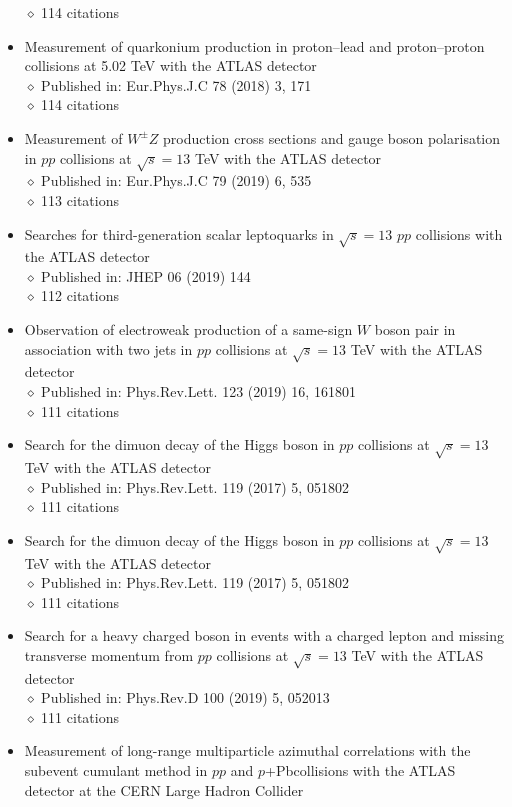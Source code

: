 \documentclass[margin, 10pt]{res} %
\begin{document}
\begin{resume}
\begin{itemize}
$\diamond$ 114 citations
\item Measurement of quarkonium production in proton–lead and proton–proton collisions at 5.02 TeV with the ATLAS detector\\
$\diamond$ Published in: Eur.Phys.J.C 78 (2018) 3, 171\\
$\diamond$ 114 citations
\item Measurement of $W^{\pm}Z$ production cross sections and gauge boson polarisation in $pp$ collisions at $\sqrt{s} = 13$ TeV with the ATLAS detector\\
$\diamond$ Published in: Eur.Phys.J.C 79 (2019) 6, 535\\
$\diamond$ 113 citations
\item Searches for third-generation scalar leptoquarks in $\sqrt{s} = 13$ $pp$ collisions with the ATLAS detector\\
$\diamond$ Published in: JHEP 06 (2019) 144\\
$\diamond$ 112 citations
\item Observation of electroweak production of a same-sign $W$ boson pair in association with two jets in $pp$ collisions at $\sqrt{s} = 13$ TeV with the ATLAS detector\\
$\diamond$ Published in: Phys.Rev.Lett. 123 (2019) 16, 161801\\
$\diamond$ 111 citations
\item Search for the dimuon decay of the Higgs boson in $pp$ collisions at $\sqrt{s} = 13$ TeV with the ATLAS detector\\
$\diamond$ Published in: Phys.Rev.Lett. 119 (2017) 5, 051802\\
$\diamond$ 111 citations
\item Search for the dimuon decay of the Higgs boson in $pp$ collisions at $\sqrt{s} = 13$ TeV with the ATLAS detector\\
$\diamond$ Published in: Phys.Rev.Lett. 119 (2017) 5, 051802\\
$\diamond$ 111 citations
\item Search for a heavy charged boson in events with a charged lepton and missing transverse momentum from $pp$ collisions at $\sqrt{s} = 13$ TeV with the ATLAS detector\\
$\diamond$ Published in: Phys.Rev.D 100 (2019) 5, 052013\\
$\diamond$ 111 citations
\item Measurement of long-range multiparticle azimuthal correlations with the subevent cumulant method in $pp$ and $p$+Pbcollisions with the ATLAS detector at the CERN Large Hadron Collider\\

\end{itemize}
\end{resume}
\end{document}
